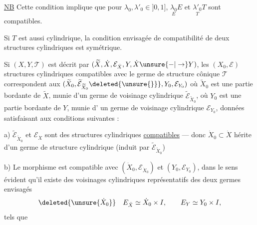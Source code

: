 \uline{NB} Cette condition implique que pour $\lambda_0,\lambda'_0\in]0,1]$,
$\underset{E}{\lambda_0}E$ et $\underset{T}{\lambda'_0}T$ sont compatibles.

Si $T$ est aussi cylindrique, la condition
envisagée de compatibilité de deux structures
cylindriques est symétrique.

Si $(X,Y,\mathcal T)$ est décrit par $(\widetilde X,\dot X,\mathcal E_{\dot X},Y,\dot X\unsure{-|\to}Y)$,
les  $(X_0,\mathcal E)$  structures cylindriques compatibles
avec le germe de structure cônique $\mathcal T$ correspondent
aux 
$(\widetilde X_0,\widetilde{\mathcal E}_{\widetilde X_0}\deleted{\unsure{\}}},Y_0,\mathcal E_{Y_0})$
où $\widetilde X_0$ est une partie bordante de  $\widetilde X$, munie
d'un germe de voisinage cylindrique $\widetilde{\mathcal E}_{\widetilde X_0}$,
où $Y_0$ est une partie bordante de $Y$, munie d'
un germe de  voisinage cylindrique
$\mathcal E_{Y_0}$,  données satisfaisant aux conditions
suivantes :

a) $\widetilde{\mathcal E}_{\widetilde X_0}$ et $\mathcal E_{\dot X}$ sont des
 structures cylindriques
\uline{compatibles} --- donc $\dot X_0\subset\dot X$
hérite d'un
germe de structure cylindrique  (induit par
$\widetilde{\mathcal E}_{\widetilde X_0}$)

b) Le morphisme
est compatible
avec $(\dot X_0,\mathcal E_{\dot X_0})$ et $(Y_0,\mathcal E_{Y_0})$, dans le sens
évident 
qu'il existe des voisinages cylindriques
représentatifs des deux germes envisagés
\[
\deleted{\unsure{\dot X_0}}\quad
E_{\dot X}\simeq\dot X_0\times I,\qquad E_Y\simeq Y_0\times I,
\]
tels que
